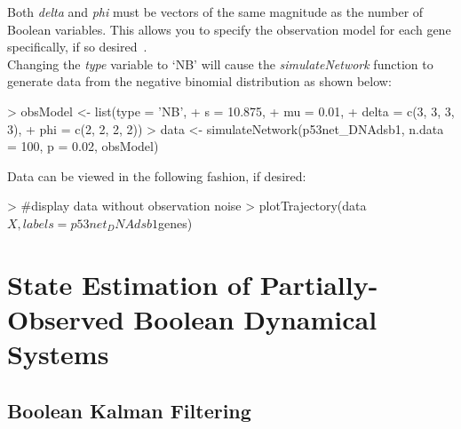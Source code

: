 \documentclass[a4paper]{article}
\theoremstyle{plain}
\theoremstyle{definition}
\theoremstyle{remark}
\begin{document}
Both \textit{delta} and \textit{phi} must be vectors of the same magnitude as the number of Boolean variables. This allows you to specify the observation model for each gene specifically, if so desired~\cite{ImanBrag:16b}. 
\\[1em]
Changing the \textit{type} variable to `NB' will cause the \textit{simulateNetwork} function to generate data from the negative binomial distribution as shown below: 

\begin{Schunk}
\begin{Sinput}
> obsModel <- list(type = 'NB', 
+                     s = 10.875, 
+                     mu = 0.01, 
+                  delta = c(3, 3, 3, 3), 
+                    phi = c(2, 2, 2, 2))
> data <- simulateNetwork(p53net_DNAdsb1, n.data = 100, p = 0.02, obsModel)
\end{Sinput}
\end{Schunk}
Data can be viewed in the following fashion, if desired:
\begin{Schunk}
\begin{Sinput}
> #display data without observation noise
> plotTrajectory(data$X, labels = p53net_DNAdsb1$genes)
\end{Sinput}
\end{Schunk}


\section{State Estimation of Partially-Observed Boolean Dynamical Systems}


\subsection{Boolean Kalman Filtering}
\end{document}
